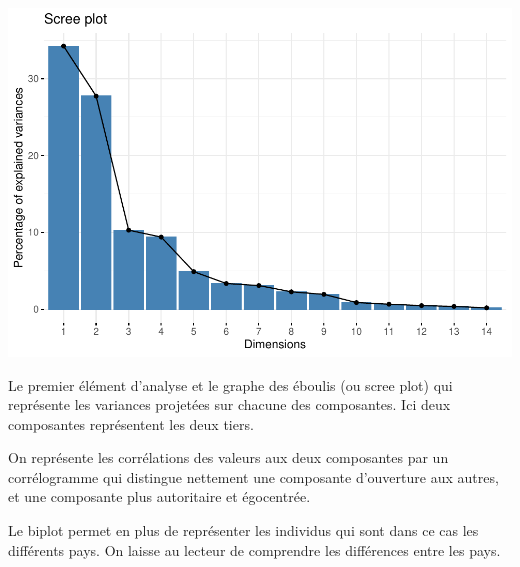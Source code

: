 \documentclass[
]{book}
\newenvironment{Shaded}{\begin{snugshade}}{\end{snugshade}}
\newcommand{\AttributeTok}[1]{\textcolor[rgb]{0.77,0.63,0.00}{#1}}
\newcommand{\ConstantTok}[1]{\textcolor[rgb]{0.00,0.00,0.00}{#1}}
\newcommand{\FloatTok}[1]{\textcolor[rgb]{0.00,0.00,0.81}{#1}}
\newcommand{\FunctionTok}[1]{\textcolor[rgb]{0.00,0.00,0.00}{#1}}
\newcommand{\NormalTok}[1]{#1}
\newcommand{\OtherTok}[1]{\textcolor[rgb]{0.56,0.35,0.01}{#1}}
\newcommand{\SpecialCharTok}[1]{\textcolor[rgb]{0.00,0.00,0.00}{#1}}
\newcommand{\StringTok}[1]{\textcolor[rgb]{0.31,0.60,0.02}{#1}}
\begin{document}
\includegraphics{bookdown-demo_files/figure-latex/0607-1.pdf}

\begin{Shaded}
\end{Shaded}

Le premier élément d'analyse et le graphe des éboulis (ou scree plot) qui représente les variances projetées sur chacune des composantes. Ici deux composantes représentent les deux tiers.

On représente les corrélations des valeurs aux deux composantes par un corrélogramme qui distingue nettement une composante d'ouverture aux autres, et une composante plus autoritaire et égocentrée.

Le biplot permet en plus de représenter les individus qui sont dans ce cas les différents pays. On laisse au lecteur de comprendre les différences entre les pays.

\begin{Shaded}
\end{Shaded}
\end{document}

